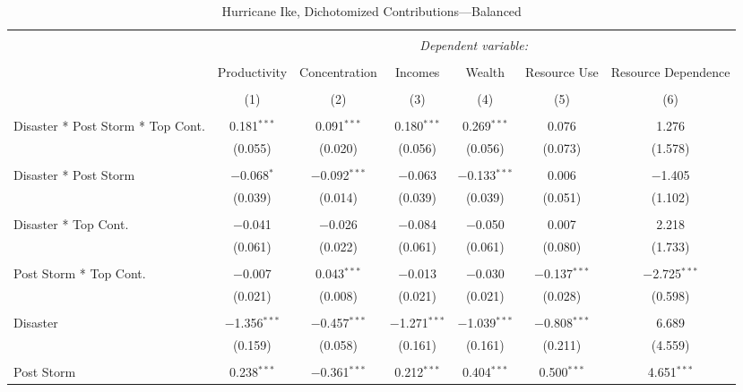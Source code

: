 
\begin{table}[!htbp] \centering 
  \caption{Hurricane Ike, Dichotomized Contributions---Balanced} 
  \label{} 
\footnotesize 
\begin{tabular}{@{\extracolsep{5pt}}lcccccc} 
\\[-1.8ex]\hline 
\hline \\[-1.8ex] 
 & \multicolumn{6}{c}{\textit{Dependent variable:}} \\ 
\cline{2-7} 
\\[-1.8ex] & Productivity & Concentration & Incomes & Wealth & Resource Use & Resource Dependence \\ 
\\[-1.8ex] & (1) & (2) & (3) & (4) & (5) & (6)\\ 
\hline \\[-1.8ex] 
 Disaster * Post Storm * Top Cont. & 0.181$^{***}$ & 0.091$^{***}$ & 0.180$^{***}$ & 0.269$^{***}$ & 0.076 & 1.276 \\ 
  & (0.055) & (0.020) & (0.056) & (0.056) & (0.073) & (1.578) \\ 
  & & & & & & \\ 
 Disaster * Post Storm & $-$0.068$^{*}$ & $-$0.092$^{***}$ & $-$0.063 & $-$0.133$^{***}$ & 0.006 & $-$1.405 \\ 
  & (0.039) & (0.014) & (0.039) & (0.039) & (0.051) & (1.102) \\ 
  & & & & & & \\ 
 Disaster * Top Cont. & $-$0.041 & $-$0.026 & $-$0.084 & $-$0.050 & 0.007 & 2.218 \\ 
  & (0.061) & (0.022) & (0.061) & (0.061) & (0.080) & (1.733) \\ 
  & & & & & & \\ 
 Post Storm *  Top Cont. & $-$0.007 & 0.043$^{***}$ & $-$0.013 & $-$0.030 & $-$0.137$^{***}$ & $-$2.725$^{***}$ \\ 
  & (0.021) & (0.008) & (0.021) & (0.021) & (0.028) & (0.598) \\ 
  & & & & & & \\ 
 Disaster & $-$1.356$^{***}$ & $-$0.457$^{***}$ & $-$1.271$^{***}$ & $-$1.039$^{***}$ & $-$0.808$^{***}$ & 6.689 \\ 
  & (0.159) & (0.058) & (0.161) & (0.161) & (0.211) & (4.559) \\ 
  & & & & & & \\ 
 Post Storm & 0.238$^{***}$ & $-$0.361$^{***}$ & 0.212$^{***}$ & 0.404$^{***}$ & 0.500$^{***}$ & 4.651$^{***}$ \\ 

\end{tabular}
\end{table}
